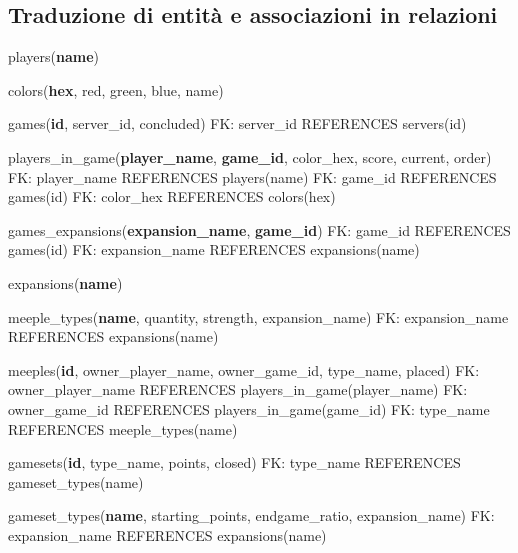 \subsection{Traduzione di entità e associazioni in relazioni}
\hspace{1.5em}players(\textbf{name})\newline

colors(\textbf{hex}, red, green, blue, name)\newline

games(\textbf{id}, server\_id, concluded)\newline
FK: server\_id REFERENCES servers(id)\newline

players\_in\_game(\textbf{player\_name}, \textbf{game\_id}, color\_hex, score, current, order)\newline
FK: player\_name REFERENCES players(name)\newline
FK: game\_id REFERENCES games(id)\newline
FK: color\_hex REFERENCES colors(hex)\newline

games\_expansions(\textbf{expansion\_name}, \textbf{game\_id})\newline
FK: game\_id REFERENCES games(id)\newline
FK: expansion\_name REFERENCES expansions(name)\newline

expansions(\textbf{name})\newline

meeple\_types(\textbf{name}, quantity, strength, expansion\_name)\newline
FK: expansion\_name REFERENCES expansions(name)\newline

meeples(\textbf{id}, owner\_player\_name, owner\_game\_id, type\_name, placed)\newline
FK: owner\_player\_name REFERENCES players\_in\_game(player\_name)\newline
FK: owner\_game\_id REFERENCES players\_in\_game(game\_id)\newline
FK: type\_name REFERENCES meeple\_types(name)\newline

gamesets(\textbf{id}, type\_name, points, closed)\newline
FK: type\_name REFERENCES gameset\_types(name)\newline

gameset\_types(\textbf{name}, starting\_points, endgame\_ratio, expansion\_name)\newline
FK: expansion\_name REFERENCES expansions(name)\newline

